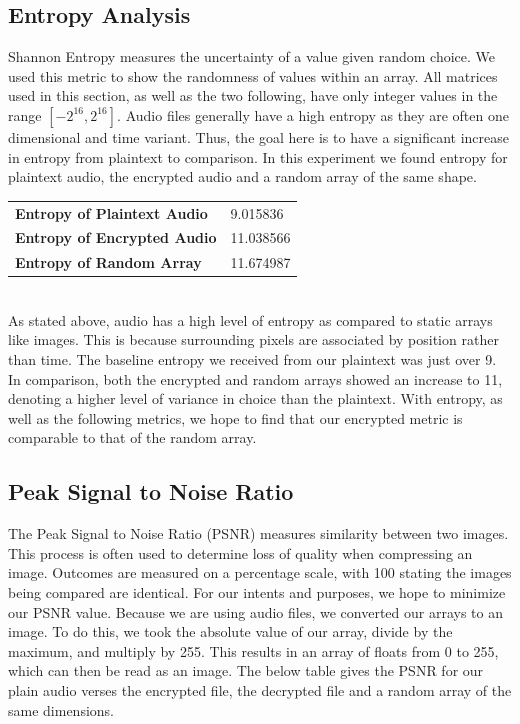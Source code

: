\documentclass[conference]{IEEEtran}
\begin{document}
\subsection{Entropy Analysis}\label{subsec:entropy-analysis}

Shannon Entropy measures the uncertainty of a value given random choice.
We used this metric to show the randomness of values within an array.
All matrices used in this section, as well as the two following, have only integer values in the range $[-2^{16}, 2^{16}]$.
Audio files generally have a high entropy as they are often one dimensional and time variant.
Thus, the goal here is to have a significant increase in entropy from plaintext to comparison.
In this experiment we found entropy for plaintext audio, the encrypted audio and a random array of the same shape.

\begin{tabular}{|l|l|}
    \hline
    \textbf{Entropy of Plaintext Audio} & 9.015836 \\
    \textbf{Entropy of Encrypted Audio} & 11.038566 \\
    \textbf{Entropy of Random Array} & 11.674987 \\
    \hline
\end{tabular}
\\

As stated above, audio has a high level of entropy as compared to static arrays like images.
This is because surrounding pixels are associated by position rather than time.
The baseline entropy we received from our plaintext was just over 9.
In comparison, both the encrypted and random arrays showed an increase to 11, denoting a higher level of variance in choice than the plaintext.
With entropy, as well as the following metrics, we hope to find that our encrypted metric is comparable to that of the random array.


\subsection{Peak Signal to Noise Ratio}\label{subsec:peak-signal-to-noise-ratio}

The Peak Signal to Noise Ratio (PSNR) measures similarity between two images.
This process is often used to determine loss of quality when compressing an image.
Outcomes are measured on a percentage scale, with 100 stating the images being compared are identical.
For our intents and purposes, we hope to minimize our PSNR value.
Because we are using audio files, we converted our arrays to an image.
To do this, we took the absolute value of our array, divide by the maximum, and multiply by 255.
This results in an array of floats from 0 to 255, which can then be read as an image.
The below table gives the PSNR for our plain audio verses the encrypted file, the decrypted file and a random array of the same dimensions.
\end{document}
